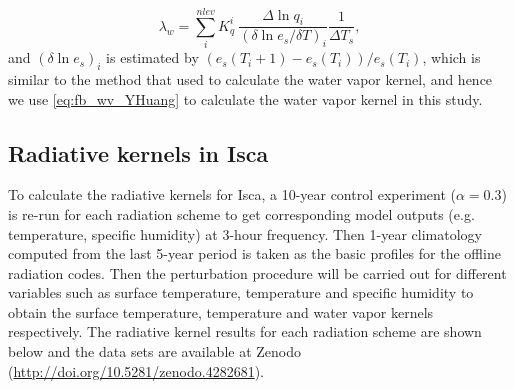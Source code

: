 \begin{equation}
\lambda_w = \sum_i^{nlev} K^i_q ~\frac{\Delta \ln q_i}{(\delta \ln e_s/ \delta T)_i} \frac{1}{\Delta T_s},
\label{eq:fb_wv_YHuang}
\end{equation}
and $(\delta \ln e_s)_i$ is estimated by $\left(e_s(T_i+1)-e_s(T_i)\right)/ e_s(T_i)$, which is similar to the method that \cite{Pendergrass2018} used to calculate the water vapor kernel, and hence we use \eqref{eq:fb_wv_YHuang} to calculate the water vapor kernel in this study.

\subsection{Radiative kernels in Isca}
 
 To calculate the radiative kernels for Isca, a 10-year control experiment ($\alpha= 0.3$) is re-run for each radiation scheme to get corresponding model outputs (e.g. temperature, specific humidity) at 3-hour frequency. Then 1-year climatology computed from the last 5-year period is taken as the basic profiles for the offline radiation codes. Then the perturbation procedure will be carried out for different variables such as surface temperature, temperature and specific humidity to obtain the surface temperature, temperature and water vapor kernels respectively. The radiative kernel results for each radiation scheme are shown below and the data sets are available at Zenodo (\url{http://doi.org/10.5281/zenodo.4282681}).


